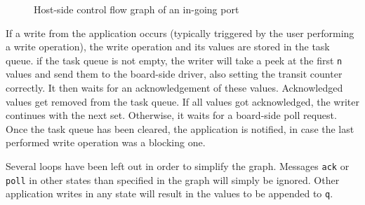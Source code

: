 \documentclass{report}
\begin{document}
\begin{figure}[h]
\centering
{}
\label{fig:cfg:hostIn}
\caption{Host-side control flow graph of an in-going port}
\end{figure}

If a write from the application occurs (typically triggered by the user performing a write operation), the write operation and its values are stored in the task queue. if the task queue is not empty, the writer will take a peek at the first \texttt{n} values and send them to the board-side driver, also setting the transit counter correctly. It then waits for an acknowledgement of these values. Acknowledged values get removed from the task queue. If all values got acknowledged, the writer continues with the next set. Otherwise, it waits for a board-side poll request. Once the task queue has been cleared, the application is notified, in case the last performed write operation was a blocking one.

Several loops have been left out in order to simplify the graph. Messages \texttt{ack} or \texttt{poll} in other states than specified in the graph will simply be ignored. Other application writes in any state will result in the values to be appended to \texttt{q}.\\
\end{document}
